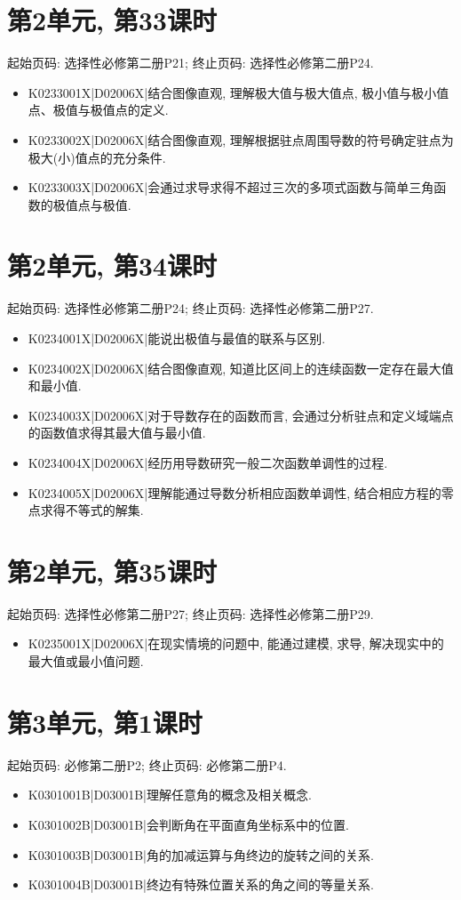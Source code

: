 \section*{第2单元, 第33课时}
起始页码: 选择性必修第二册P21; 终止页码: 选择性必修第二册P24.
\begin{itemize}
\item K0233001X|D02006X|结合图像直观, 理解极大值与极大值点, 极小值与极小值点、极值与极值点的定义.
\item K0233002X|D02006X|结合图像直观, 理解根据驻点周围导数的符号确定驻点为极大(小)值点的充分条件.
\item K0233003X|D02006X|会通过求导求得不超过三次的多项式函数与简单三角函数的极值点与极值.
\end{itemize}

\section*{第2单元, 第34课时}
起始页码: 选择性必修第二册P24; 终止页码: 选择性必修第二册P27.
\begin{itemize}
\item K0234001X|D02006X|能说出极值与最值的联系与区别.
\item K0234002X|D02006X|结合图像直观, 知道比区间上的连续函数一定存在最大值和最小值.
\item K0234003X|D02006X|对于导数存在的函数而言, 会通过分析驻点和定义域端点的函数值求得其最大值与最小值.
\item K0234004X|D02006X|经历用导数研究一般二次函数单调性的过程.
\item K0234005X|D02006X|理解能通过导数分析相应函数单调性, 结合相应方程的零点求得不等式的解集.
\end{itemize}

\section*{第2单元, 第35课时}
起始页码: 选择性必修第二册P27; 终止页码: 选择性必修第二册P29.
\begin{itemize}
\item K0235001X|D02006X|在现实情境的问题中, 能通过建模, 求导, 解决现实中的最大值或最小值问题.
\end{itemize}

\section*{第3单元, 第1课时}
起始页码: 必修第二册P2; 终止页码: 必修第二册P4.
\begin{itemize}
\item K0301001B|D03001B|理解任意角的概念及相关概念.
\item K0301002B|D03001B|会判断角在平面直角坐标系中的位置.
\item K0301003B|D03001B|角的加减运算与角终边的旋转之间的关系.
\item K0301004B|D03001B|终边有特殊位置关系的角之间的等量关系.
\end{itemize}

